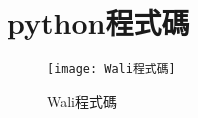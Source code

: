 \chapter{python程式碼}

\begin{figure}
  \centering
  \texttt{[image: Wali程式碼]}
  \caption{\Large Wali程式碼}
  \label{fig:wali_code}
\end{figure}
\newpage
